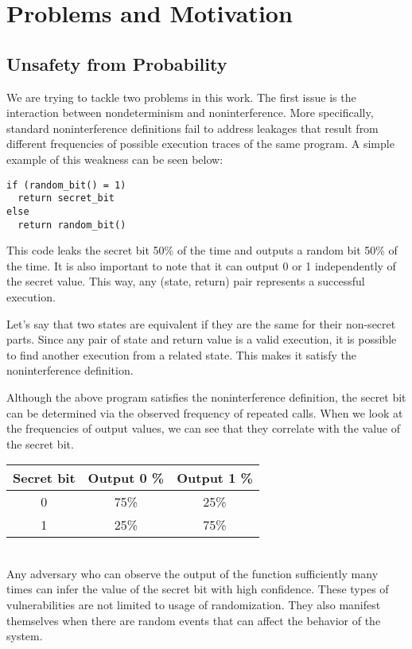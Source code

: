 
\section{Problems and Motivation}
\subsection{Unsafety from Probability}
We are trying to tackle two problems in this work. The first issue is the interaction between nondeterminism and noninterference. More specifically, standard noninterference definitions fail to address leakages that result from different frequencies of possible execution traces of the same program. A simple example of this weakness can be seen below: 

\begin{lstlisting}
if (random_bit() = 1)
  return secret_bit
else
  return random_bit()
\end{lstlisting}

This code leaks the secret bit 50\% of the time and outputs a random bit 50\% of the time. It is also important to note that it can output 0 or 1 independently of the secret value. This way, any (state, return) pair represents a successful execution. 

Let's say that two states are equivalent if they are the same for their non-secret parts. Since any pair of state and return value is a valid execution, it is possible to find another execution from a related state. This makes it satisfy the noninterference definition.

Although the above program satisfies the noninterference definition, the secret bit can be determined via the observed frequency of repeated calls. When we look at the frequencies of output values, we can see that they correlate with the value of the secret bit.\\

\begin{tabular}{| c | c | c |}
	\hline
	Secret bit & Output 0 \% & Output 1 \% \\
	\hline
	0 &	75\% & 25\% \\
	\hline
	1 &	25\% & 75\% \\
	\hline
\end{tabular}\\

Any adversary who can observe the output of the function sufficiently many times can infer the value of the secret bit with high confidence. These types of vulnerabilities are not limited to usage of randomization. They also manifest themselves when there are random events that can affect the behavior of the system. 

